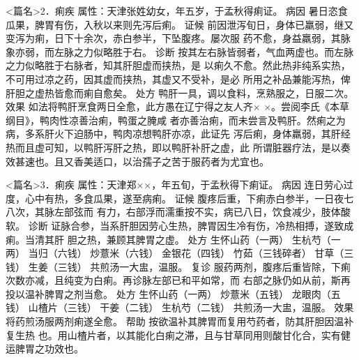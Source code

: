 \documentclass[a4paper,12pt,UTF8,twoside]{ctexbook}
\begin{document}
<篇名>2．痢疾
属性：天津张姓幼女，年五岁，于孟秋得痢证。 
病因 暑日恣食瓜果，脾胃有伤，入秋以来则先泻后痢。 
证候 前因泄泻旬日，身体已羸弱，继又变泻为痢，日下十余次，赤白参半，下坠腹疼。屡次服 
药不愈，身益羸弱，其脉象亦弱，而左脉之力似略胜于右。 
诊断 按其左右脉皆弱者，气血两虚也。而左脉之力似略胜于右脉者，知其肝胆虚而挟热，是 
以痢久不愈。然此热非纯系实热，不可用过凉之药，因其虚而挟热，其虚又不受补，是必 
所用之补品兼能泻热，俾肝胆之虚热皆愈而痢自愈矣。 
处方 鸭肝一具，调以食料，烹熟服之，日服二次。 
效果 如法将鸭肝烹食两日全愈，此方愚在辽宁得之友人齐× 
×。尝阅李氏《本草纲目》，鸭肉性凉善治痢，鸭蛋之腌咸 
者亦善治痢，而未尝言及鸭肝。然痢之为病，多系肝火下迫肠中，鸭肉凉想鸭肝亦凉，此证先 
泻后痢，身体羸弱，其肝经热而且虚可知，以鸭肝泻肝之热，即以鸭肝补肝之虚，此 
所谓脏器疗法，是以奏效甚速也。且又香美适口，以治孺子之苦于服药者为尤宜也。 


<篇名>3．痢疾
属性：天津郑××，年五旬，于孟秋得下痢证。 
病因 连日劳心过度，心中有热，多食瓜果，遂至病痢。 
证候 腹疼后重，下痢赤白参半，一日夜七八次，其脉左部弦而 
有力，右部浮而濡重按不实，病已八日，饮食减少，肢体酸软。 
诊断 证脉合参，当系肝胆因劳心生热，脾胃因生冷有伤，冷热相搏，遂致成痢。当清其肝 
胆之热，兼顾其脾胃之虚。 
处方 生怀山药（一两） 生杭芍（一两） 当归（六钱） 炒薏米（六钱） 
金银花（四钱） 竹茹（三钱碎者） 甘草（三钱） 生姜（三钱） 
共煎汤一大盅，温服。 
复诊 服药两剂，腹疼后重皆除，下痢次数亦减，且纯变为白痢。再诊脉左部已和平如常，而 
右部之脉仍如从前，斯再投以温补脾胃之剂当愈。 
处方 生怀山药（一两） 炒薏米（五钱） 龙眼肉（五钱） 山楂片（三钱） 
干姜（二钱） 生杭芍（二钱） 
共煎汤一大盅，温服。 
效果 将药煎汤服两剂痢遂全愈。 
帮助 按欲温补其脾胃而复用芍药者，防其肝胆因温补复生热 
也。用山楂片者，以其能化白痢之滞，且与甘草同用则酸甘化合，实有健运脾胃之功效也。 
\end{document}

